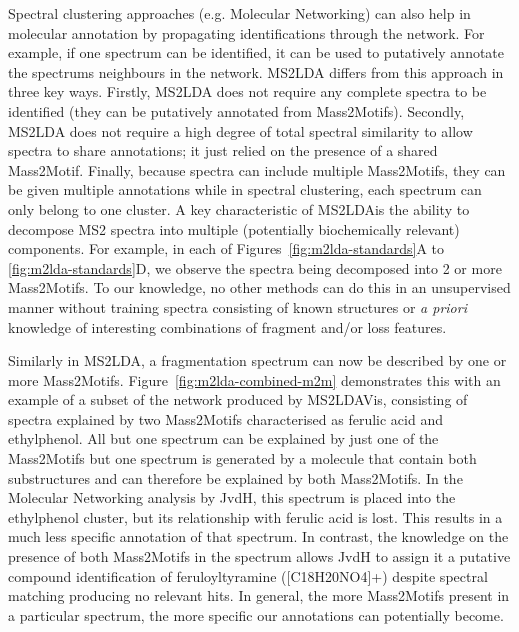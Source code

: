Spectral clustering approaches (e.g. Molecular Networking) can also help in molecular annotation by propagating identifications through the network. For example, if one spectrum can be identified, it can be used to putatively annotate the spectrums neighbours in the network. MS2LDA differs from this approach in three key ways. Firstly, MS2LDA does not require any complete spectra to be identified (they can be putatively annotated from Mass2Motifs). Secondly, MS2LDA does not require a high degree of total spectral similarity to allow spectra to share annotations; it just relied on the presence of a shared Mass2Motif. Finally, because spectra can include multiple Mass2Motifs, they can be given multiple annotations while in spectral clustering, each spectrum can only belong to one cluster. A key characteristic of MS2LDAis the ability to decompose MS2 spectra into multiple (potentially biochemically relevant) components. For example, in each of Figures~\ref{fig:m2lda-standards}A to \ref{fig:m2lda-standards}D, we observe the spectra being decomposed into 2 or more Mass2Motifs. To our knowledge, no other methods can do this in an unsupervised manner without training spectra consisting of known structures or \textit{a priori} knowledge of interesting combinations of fragment and/or loss features.

Similarly in MS2LDA, a fragmentation spectrum can now be described by one or more Mass2Motifs. Figure~\ref{fig:m2lda-combined-m2m} demonstrates this with an example of a subset of the network produced by MS2LDAVis, consisting of spectra explained by two Mass2Motifs characterised as ferulic acid and ethylphenol. All but one spectrum can be explained by just one of the Mass2Motifs but one spectrum is generated by a molecule that contain both substructures and can therefore be explained by both Mass2Motifs. In the Molecular Networking analysis by JvdH, this spectrum is placed into the ethylphenol cluster, but its relationship with ferulic acid is lost. This results in a much less specific annotation of that spectrum. In contrast, the knowledge on the presence of both Mass2Motifs in the spectrum allows JvdH to assign it a putative compound identification of feruloyltyramine ([C18H20NO4]+) despite spectral matching producing no relevant hits. In general, the more Mass2Motifs present in a particular spectrum, the more specific our annotations can potentially become.

